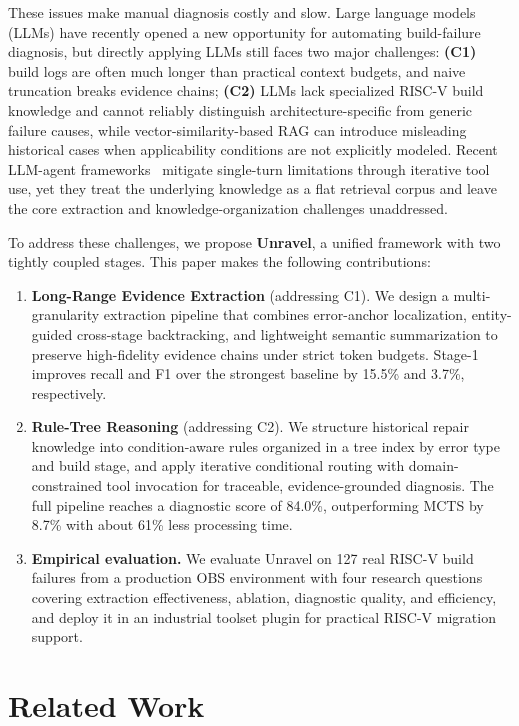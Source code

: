\documentclass[sigconf,anonymous]{acmart}
\begin{document}
These issues make manual diagnosis costly and slow. Large language models (LLMs) have recently opened a new opportunity for automating build-failure diagnosis, but directly applying LLMs still faces two major challenges: \textbf{(C1)} build logs are often much longer than practical context budgets, and naive truncation breaks evidence chains; \textbf{(C2)} LLMs lack specialized RISC-V build knowledge and cannot reliably distinguish architecture-specific from generic failure causes, while vector-similarity-based RAG can introduce misleading historical cases when applicability conditions are not explicitly modeled. Recent LLM-agent frameworks~\cite{wang2024rcagent,yang2024swe} mitigate single-turn limitations through iterative tool use, yet they treat the underlying knowledge as a flat retrieval corpus and leave the core extraction and knowledge-organization challenges unaddressed.

To address these challenges, we propose \textbf{Unravel}, a unified framework with two tightly coupled stages. This paper makes the following contributions:
\begin{enumerate}[topsep=2pt,itemsep=3pt]
\item \textbf{Long-Range Evidence Extraction} (addressing C1). We design a multi-granularity extraction pipeline that combines error-anchor localization, entity-guided cross-stage backtracking, and lightweight semantic summarization to preserve high-fidelity evidence chains under strict token budgets. Stage-1 improves recall and F1 over the strongest baseline by 15.5\% and 3.7\%, respectively.
\item \textbf{Rule-Tree Reasoning} (addressing C2). We structure historical repair knowledge into condition-aware rules organized in a tree index by error type and build stage, and apply iterative conditional routing with domain-constrained tool invocation for traceable, evidence-grounded diagnosis. The full pipeline reaches a diagnostic score of 84.0\%, outperforming MCTS by 8.7\% with about 61\% less processing time.
\item \textbf{Empirical evaluation.} We evaluate Unravel on 127 real RISC-V build failures from a production OBS environment with four research questions covering extraction effectiveness, ablation, diagnostic quality, and efficiency, and deploy it in an industrial toolset plugin for practical RISC-V migration support.
\end{enumerate}

\section{Related Work}
\end{document}
